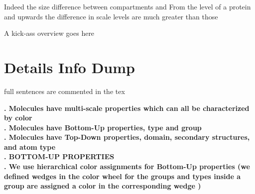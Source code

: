 \documentclass[review,journal]{vgtc}         %
\begin{document}
Indeed the size difference between compartments and 
From the level of a protein and upwards the difference in scale levels are much greater than those 
 

A kick-ass overview goes here

\section{Details Info Dump}

full sentences are commented in the tex

\textbf{. Molecules have multi-scale properties which can all be characterized by color } \\


\textbf{. Molecules have Bottom-Up properties, type and group} \\


\textbf{. Molecules have Top-Down properties, domain, secondary structures, and atom type} \\


\textbf{. BOTTOM-UP PROPERTIES} \\

\textbf{. We use hierarchical color assignments for Bottom-Up properties (we defined wedges in the color wheel for the groups and types inside a group are assigned a color in the corresponding wedge )} \\
\end{document}
